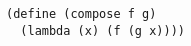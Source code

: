 \documentclass[a4paper,12pt]{article}
\begin{document}
\begin{lstlisting}
(define (compose f g)
  (lambda (x) (f (g x))))
\end{lstlisting}
\end{document}
